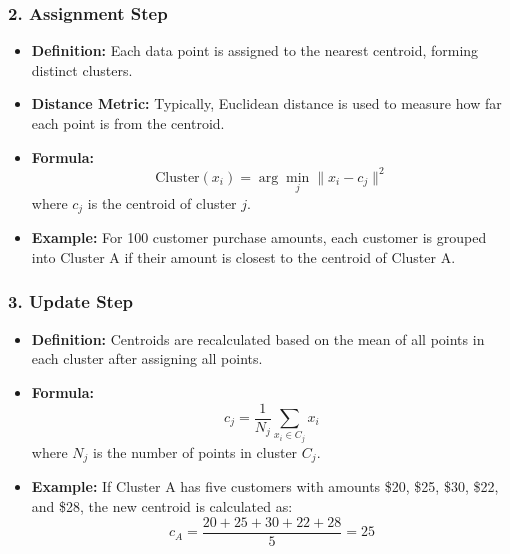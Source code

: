\documentclass{beamer}
\begin{document}
\begin{frame}[fragile]
    \frametitle{2. Assignment Step}
    \begin{itemize}
        \item \textbf{Definition:} Each data point is assigned to the nearest centroid, forming distinct clusters.
        \item \textbf{Distance Metric:} Typically, Euclidean distance is used to measure how far each point is from the centroid.
        \item \textbf{Formula:}
        \begin{equation}
            \text{Cluster}(x_i) = \arg\min_{j} \| x_i - c_j \|^2
        \end{equation}
        where $c_j$ is the centroid of cluster $j$.
        \item \textbf{Example:} For 100 customer purchase amounts, each customer is grouped into Cluster A if their amount is closest to the centroid of Cluster A.
    \end{itemize}
\end{frame}

\begin{frame}[fragile]
    \frametitle{3. Update Step}
    \begin{itemize}
        \item \textbf{Definition:} Centroids are recalculated based on the mean of all points in each cluster after assigning all points.
        \item \textbf{Formula:}
        \begin{equation}
            c_j = \frac{1}{N_j} \sum_{x_i \in C_j} x_i
        \end{equation}
        where $N_j$ is the number of points in cluster $C_j$.
        \item \textbf{Example:} If Cluster A has five customers with amounts \$20, \$25, \$30, \$22, and \$28, the new centroid is calculated as:
        \begin{equation}
            c_A = \frac{20 + 25 + 30 + 22 + 28}{5} = 25
        \end{equation}
    \end{itemize}
\end{frame}
\end{document}
